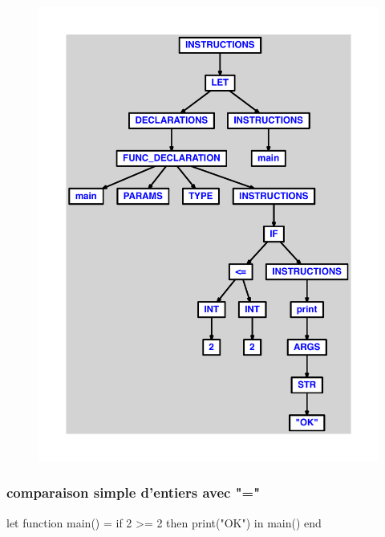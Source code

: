 \documentclass{article}
\begin{document}
\begin{figure}[H]\centering\includegraphics[max width=\textwidth]{ast/ast_169.pdf}\end{figure}\subsubsection{comparaison simple d'entiers avec "="}
\begin{verbatimtab}
let
	function main() =
		if 2 >= 2 then print("OK")
in main() end
\end{verbatimtab}
\end{document}
